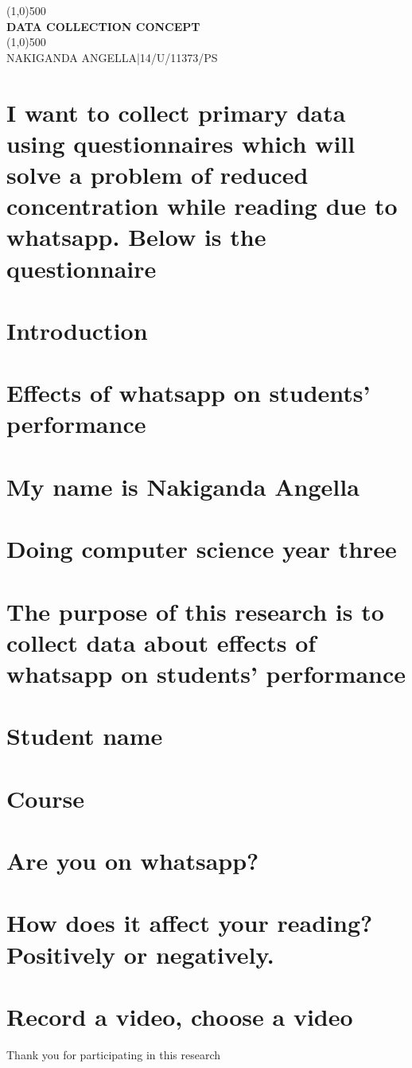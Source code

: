 \documentclass[12pt,a4paper]{article}
\begin{document}
\begin{titlepage}
    \begin{center}
\line(1,0){500}\\
\huge{\bfseries DATA COLLECTION CONCEPT\\}
\line(1,0){500}\\
[0.25in]
NAKIGANDA ANGELLA|14/U/11373/PS\\
\end{center}
\end{titlepage}
\section{I want to collect primary data using questionnaires which will solve a problem of reduced concentration while reading due to whatsapp. Below is the questionnaire}
\section{Introduction}
 \section{Effects of whatsapp on students’ performance}
\section{My name is Nakiganda Angella}
\section{Doing computer science year three}
\section{The purpose of this research is to collect data about effects of whatsapp on students’ performance}
\section{Student name}
\section{ Course}
\section{ Are you on whatsapp?}
\section{How does it affect your reading? Positively or negatively.}
\section{Record a video, choose a video}
Thank you for participating in this research
\end{document}
